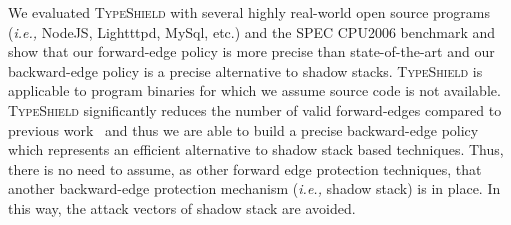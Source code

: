 We evaluated \textsc{TypeShield} with several highly real-world open source programs (\textit{i.e.,} NodeJS, Lightttpd, MySql, etc.) and the SPEC CPU2006 benchmark
and show that our forward-edge policy is more precise than state-of-the-art and our backward-edge policy is a precise 
alternative to shadow stacks. 
\textsc{TypeShield} is applicable to program binaries for which we assume source code is not available.
\textsc{TypeShield} significantly reduces the number of valid forward-edges compared to previous work~\cite{veen:typearmor} and thus we are able 
to build a precise backward-edge policy which represents an efficient alternative to shadow stack based techniques.
Thus, there is no need to assume, as other forward edge protection techniques, that another backward-edge protection mechanism (\textit{i.e.,} shadow stack) is in place. In this way, the 
attack vectors of shadow stack are avoided.


